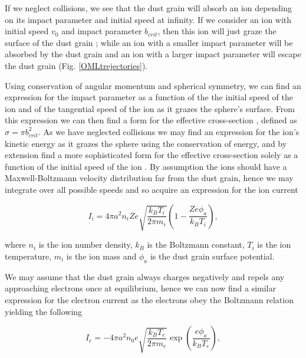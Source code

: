 \documentclass[journal]{Imperial_lab_report}
\begin{document}
If we neglect collisions, we see that the dust grain will absorb an ion depending on its impact parameter and initial speed at infinity. If we consider an ion with initial speed $v_{0}$ and impact parameter $b_{crit}$, then this ion will just graze the surface of the dust grain \cite{Thomas}; while an ion with a smaller impact parameter will be absorbed by the dust grain and an ion with a larger impact parameter will escape the dust grain (Fig. \ref{OMLtrejectories}).

\medskip 

Using conservation of angular momentum and spherical symmetry, we can find an expression for the impact parameter as a function of the the initial speed of the ion and of the tangential speed of the ion as it grazes the sphere's surface. From this expression we can then find a form for the effective cross-section \cite{Thomas}, defined as $\sigma = \pi b_{crit}^2$. As we have neglected collisions we may find an expression for the ion's kinetic energy as it grazes the sphere using the conservation of energy, and by extension find a more sophisticated form for the effective cross-section solely as a function of the initial speed of the ion \cite{Thomas}. By assumption the ions should have a Maxwell-Boltzmann velocity distribution far from the dust grain, hence we may integrate over all possible speeds and so acquire an expression for the ion current

\begin{equation}\label{eq:Icurrent}
I_{i} = 4\pi a^2 n_{i} Ze \sqrt{\frac{k_{B}T_{i}}{2\pi m_{i}}} \left(1 - \frac{Ze\phi_{a}}{k_{B}T_{i}}\right),
\end{equation}

\noindent where $n_{i}$ is the ion number density, $k_{B}$ is the Boltzmann constant, $T_{i}$ is the ion temperature, $m_{i}$ is the ion mass and $\phi_{a}$ is the dust grain surface potential.

\medskip

We may assume that the dust grain always charges negatively \cite{Thomas} and repels any approaching electrons once at equilibrium, hence we can now find a similar expression for the electron current as the electrons obey the Boltzmann relation yielding the following 

\begin{equation}\label{eq:Ecurrent}
I_{e} = -4\pi a^2 n_{0} e \sqrt{\frac{k_{B}T_{e}}{2\pi m_{e}}} \exp\left(\frac{e\phi_{a}}{k_{B}T_{e}}\right),
\end{equation}
\end{document}
